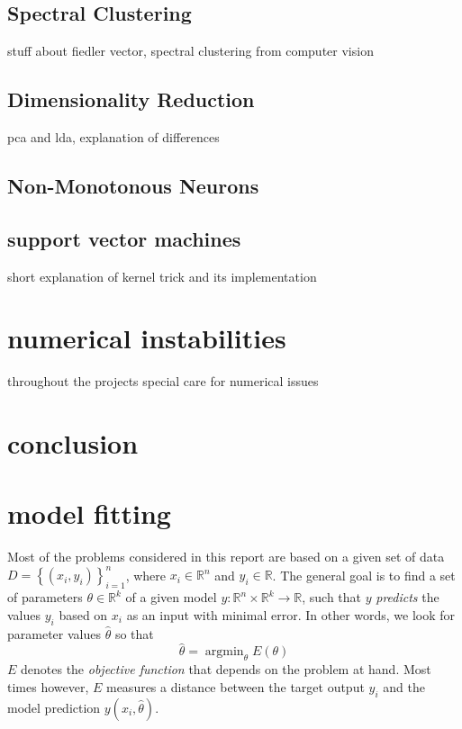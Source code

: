 \documentclass{article}
\DeclareMathOperator*{\argmin}{argmin} %
\begin{document}
\subsection{Spectral Clustering}
stuff about fiedler vector, spectral clustering from computer vision
\subsection{Dimensionality Reduction}
pca and lda, explanation of differences
\subsection{Non-Monotonous Neurons}

\subsection{support vector machines}
short explanation of kernel trick and its implementation
\section{numerical instabilities}
throughout the projects special care for numerical issues
\section{conclusion}



























\section{model fitting}
\label{sec:models}
Most of the problems considered in this report are based on a given set of data $D = \left\{ (x_i,y_i) \right\} _{i=1}^n$, where $x_i \in \mathbb{R}^n$ and $y_i \in \mathbb{R}$. The general goal is to find a set of parameters $\theta \in \mathbb{R}^k$ of a given model $y:\mathbb{R}^n \times \mathbb{R}^k \to \mathbb{R}$, such that $y$ \emph{predicts} the values $y_i$ based on $x_i$ as an input with minimal error. In other words, we look for parameter values $\hat{\theta}$ so that
\begin{equation} \label{eq:argmin}
\hat{\theta} = \argmin_\theta E(\theta)
\end{equation}
$E$ denotes the \emph{objective function} that depends on the problem at hand. Most times however, $E$ measures a distance between the target output $y_i$ and the model prediction $y(x_i,\hat{\theta})$.
\end{document}
